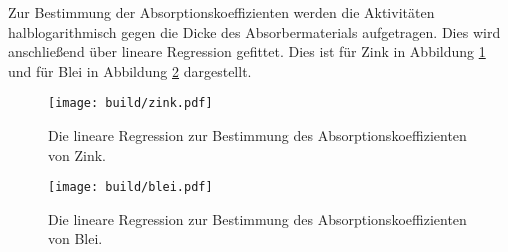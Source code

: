 Zur Bestimmung der Absorptionskoeffizienten werden die Aktivitäten halblogarithmisch gegen die Dicke des Absorbermaterials aufgetragen.
Dies wird anschließend über lineare Regression gefittet.
Dies ist für Zink in Abbildung \ref{fig:zink1} und für Blei in Abbildung \ref{fig:blei1} dargestellt.

\begin{figure}
  \centering
  \texttt{[image: build/zink.pdf]}
  \caption{Die lineare Regression zur Bestimmung des Absorptionskoeffizienten von Zink.}
  \label{fig:zink1}
\end{figure}

\begin{figure}
  \centering
  \texttt{[image: build/blei.pdf]}
  \caption{Die lineare Regression zur Bestimmung des Absorptionskoeffizienten von Blei.}
  \label{fig:blei1}
\end{figure}
